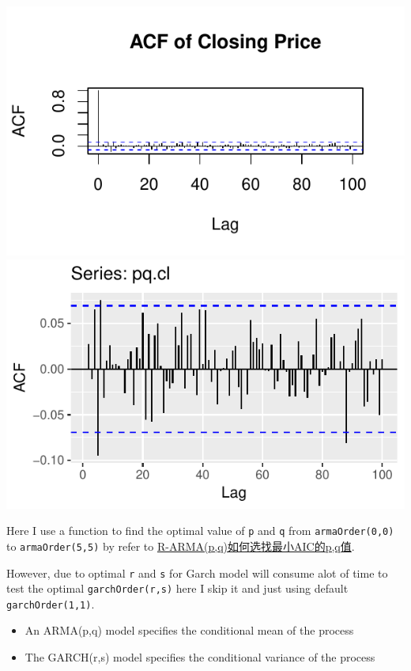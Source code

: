 \documentclass[]{tufte-book}
\providecommand{\tightlist}{%
  \setlength{\itemsep}{0pt}\setlength{\parskip}{0pt}}
\begin{document}
\includegraphics{binary-forex-trading-Q1_files/figure-latex/acf-pacf-19}
\includegraphics{binary-forex-trading-Q1_files/figure-latex/acf-pacf-20}

Here I use a function to find the optimal value of \texttt{p} and
\texttt{q} from \texttt{armaOrder(0,0)} to \texttt{armaOrder(5,5)} by
refer to
\href{http://blog.csdn.net/u012543538/article/details/38663715}{{R-ARMA(p,q)如何选找最小AIC的p,q值}}.

However, due to optimal \texttt{r} and \texttt{s} for Garch model will
consume alot of time to test the optimal \texttt{garchOrder(r,s)} here I
skip it and just using default \texttt{garchOrder(1,1)}.

\begin{itemize}
\tightlist
\item
  An ARMA(p,q) model specifies the conditional mean of the process
\item
  The GARCH(r,s) model specifies the conditional variance of the process
\end{itemize}
\end{document}
